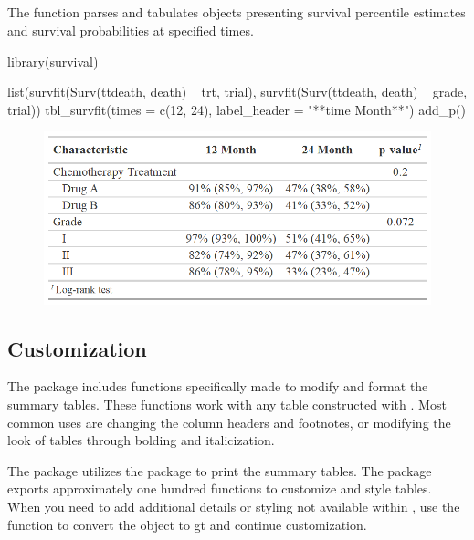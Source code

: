 \subsection{\texorpdfstring{}{tbl\_survfit()}}

The  function parses and tabulates  objects presenting survival percentile estimates and survival probabilities at specified times. 

\begin{example}
library(survival)

list(survfit(Surv(ttdeath, death) ~ trt, trial),
     survfit(Surv(ttdeath, death) ~ grade, trial)) %
  tbl_survfit(times = c(12, 24),
              label_header = "**{time} Month**") %
  add_p()
\end{example}

\begin{figure}[h!]
  \includegraphics[scale=0.49]{survfit.png}
  \centering
\end{figure}

\subsection{Customization}

The  package includes functions specifically made to modify and format the summary tables.
These functions work with any table constructed with .
Most common uses are changing the column headers and footnotes, or modifying the look of tables through bolding and italicization. 



The  package utilizes the  package to print the summary tables.
The  package exports approximately one hundred functions to customize and style tables.
When you need to add additional details or styling not available within , use the  function to convert the  object to gt and continue customization.


